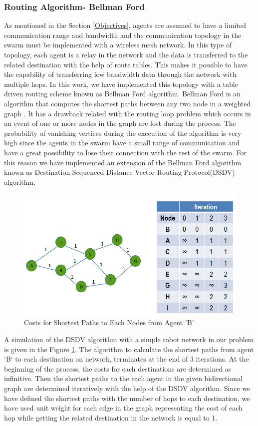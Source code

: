 \subsubsection{Routing Algorithm- Bellman Ford}
As mentioned in the Section \ref{Objectives}, agents are assumed to have a limited communication range and bandwidth and the communication topology in the swarm must be implemented with a wireless mesh network. In this type of topology, each agent is a relay in the network and the data is transferred to the related destination with the help of route tables. This makes it possible to have the capability of transferring low bandwidth data through the network with multiple hops.  In this work, we have implemented this topology with a table driven routing scheme known as Bellman Ford algorithm. Bellman Ford is an algorithm that computes the shortest paths between any two node in a weighted graph \cite{wiki_bellman}. It has a drawback related with the routing loop problem which occurs in an event of one or more nodes in the graph are lost during the process. The probability of vanishing vertices during the execution of the algorithm is very high since the agents in the swarm have a small range of communication and have a great possibility to lose their connection with the rest of the swarm. For this reason we have implemented an extension of the Bellman Ford algorithm known as Destination-Sequenced Distance Vector Routing Protocol(DSDV) algorithm.  
	
\begin{figure}[H]
\caption{Costs for Shortest Paths to Each Nodes from Agent 'B'} \label{bellman_ref}
\centering
\includegraphics[scale = 0.50]{bellman}
\end{figure}

A simulation of the DSDV algorithm with a simple robot network in our problem is given in the Figure \ref{bellman_ref}. The algorithm to calculate the shortest paths from agent `B` to each destination on network, terminates at the end of 3 iterations. At the beginning of the process, the costs for each destinations are determined as infinitive. Then the shortest paths to the each agent in the given bidirectional graph are determined iteratively with the help of the DSDV algorithm. Since we have defined the shortest paths with the number of hops to each destination, we have used unit weight for each edge in the graph representing the cost of each hop while getting the related destination in the network is equal to 1. 

